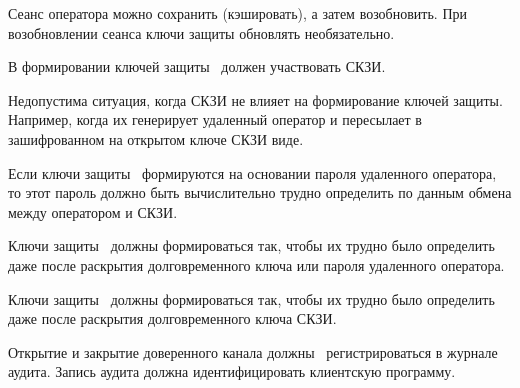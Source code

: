 \begin{note}
Сеанс оператора можно сохранить (кэшировать), а затем возобновить.
При возобновлении сеанса ключи защиты обновлять необязательно.
\end{note}

\label{R.TC.Keys}
В формировании ключей защиты~ должен участвовать СКЗИ.

\begin{note}
Недопустима ситуация, когда СКЗИ не влияет на формирование ключей защиты.
Например, когда их генерирует удаленный оператор и пересылает 
в зашифрованном на открытом ключе СКЗИ виде.
\end{note}

\label{R.TC.Pwd}
Если ключи защиты~ формируются на основании пароля
удаленного оператора, то этот пароль должно быть вычислительно
трудно определить по данным обмена между оператором и СКЗИ.

\label{R.TC.FSWeak}
Ключи защиты~ должны формироваться так, чтобы их трудно
было определить даже после раскрытия долговременного ключа или пароля удаленного 
оператора.

\label{R.TC.FS}
Ключи защиты~ должны формироваться так, 
чтобы их трудно было определить даже после раскрытия долговременного ключа 
СКЗИ.

\label{R.TC.AU}
Открытие и закрытие доверенного канала должны~ 
регистрироваться в журнале аудита. Запись аудита должна идентифицировать 
клиентскую программу.



